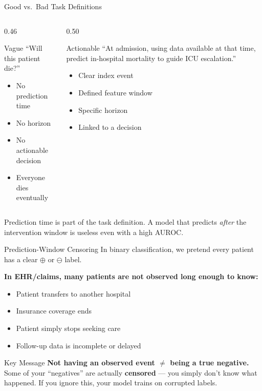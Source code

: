 \documentclass[aspectratio=169,10pt]{beamer}
\begin{document}
\begin{frame}{Good vs.\ Bad Task Definitions}
\begin{columns}[T]
\begin{column}{0.46\textwidth}
\begin{alertblock}{Vague}
``Will this patient die?''
\begin{itemize}
    \item No prediction time
    \item No horizon
    \item No actionable decision
    \item Everyone dies eventually
\end{itemize}
\end{alertblock}
\end{column}
\begin{column}{0.50\textwidth}
\pause
\begin{exampleblock}{Actionable}
``At admission, using data available at that time, predict in-hospital mortality to guide ICU escalation.''
\begin{itemize}
    \item Clear index event
    \item Defined feature window
    \item Specific horizon
    \item Linked to a decision
\end{itemize}
\end{exampleblock}
\end{column}
\end{columns}
\vspace{0.3em}
\pause
\alert{Prediction time is part of the task definition.} A model that predicts \emph{after} the intervention window is useless even with a high AUROC.
\end{frame}

\begin{frame}{Prediction-Window Censoring}
In binary classification, we pretend every patient has a clear $\oplus$ or $\ominus$ label.
\vspace{0.3em}

\textbf{In EHR/claims, many patients are not observed long enough to know:}
\begin{itemize}[<+->]
    \item Patient transfers to another hospital
    \item Insurance coverage ends
    \item Patient simply stops seeking care
    \item Follow-up data is incomplete or delayed
\end{itemize}
\begin{alertblock}{Key Message}
\textbf{Not having an observed event $\neq$ being a true negative.}
Some of your ``negatives'' are actually \textbf{censored} --- you simply don't know what happened. If you ignore this, your model trains on corrupted labels.
\end{alertblock}
\end{frame}
\end{document}

